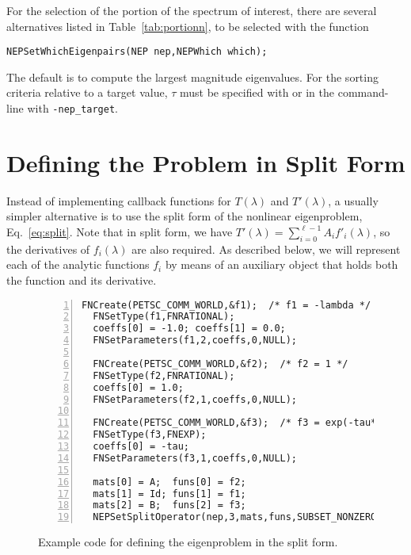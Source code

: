 	For the selection of the portion of the spectrum of interest, there are several alternatives listed in Table~\ref{tab:portionn}, to be selected with the function
	\begin{Verbatim}[fontsize=\small]
	NEPSetWhichEigenpairs(NEP nep,NEPWhich which);
	\end{Verbatim}
The default is to compute the largest magnitude eigenvalues.
For the sorting criteria relative to a target value, $\tau$ must be specified with  or in the command-line with \Verb!-nep_target!.

\section{\label{sec:nepsplit}Defining the Problem in Split Form}

Instead of implementing callback functions for $T(\lambda)$ and $T'(\lambda)$, a usually simpler alternative is to use the split form of the nonlinear eigenproblem, Eq.\ \ref{eq:split}. Note that in split form, we have $T'(\lambda)=\sum_{i=0}^{\ell-1}A_if'_i(\lambda)$, so the derivatives of $f_i(\lambda)$ are also required. As described below, we will represent each of the analytic functions $f_i$ by means of an auxiliary object  that holds both the function and its derivative.

\begin{figure}
\begin{Verbatim}[fontsize=\small,numbers=left,numbersep=6pt,xleftmargin=15mm]
  FNCreate(PETSC_COMM_WORLD,&f1);  /* f1 = -lambda */
  FNSetType(f1,FNRATIONAL);
  coeffs[0] = -1.0; coeffs[1] = 0.0;
  FNSetParameters(f1,2,coeffs,0,NULL);

  FNCreate(PETSC_COMM_WORLD,&f2);  /* f2 = 1 */
  FNSetType(f2,FNRATIONAL);
  coeffs[0] = 1.0;
  FNSetParameters(f2,1,coeffs,0,NULL);

  FNCreate(PETSC_COMM_WORLD,&f3);  /* f3 = exp(-tau*lambda) */
  FNSetType(f3,FNEXP);
  coeffs[0] = -tau;
  FNSetParameters(f3,1,coeffs,0,NULL);

  mats[0] = A;  funs[0] = f2;
  mats[1] = Id; funs[1] = f1;
  mats[2] = B;  funs[2] = f3;
  NEPSetSplitOperator(nep,3,mats,funs,SUBSET_NONZERO_PATTERN);
\end{Verbatim}
\caption{\label{fig:ex-split}Example code for defining the  eigenproblem in the split form.}
\end{figure}

